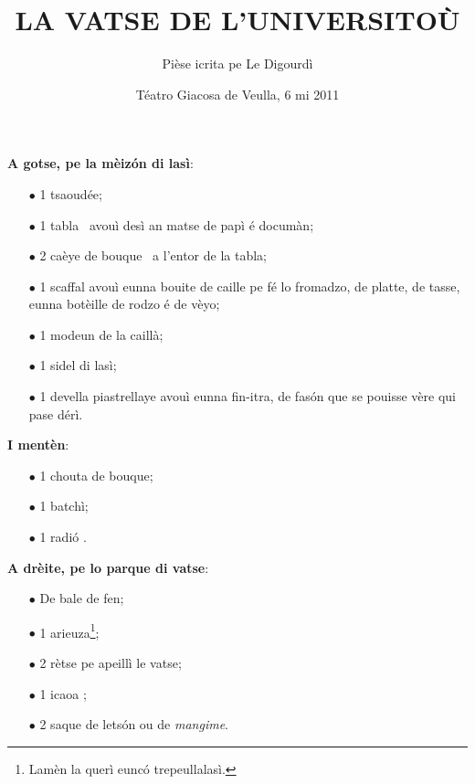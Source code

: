 \title{LA VATSE DE L’UNIVERSITO\`U}
\author{Pièse icrita pe Le Digourdì}
\date{Téatro Giacosa de Veulla, 6 mi 2011}

\maketitle






\Scenographie
\textbf{A gotse, pe la mèiz\'on di lasì}:
\begin{itemize}
\item[$\bullet$] 1 tsaoudée;
\item[$\bullet$] 1 tabla \tabla\ avouì desì an matse de papì é documàn;
\item[$\bullet$] 2 caèye de bouque \sediaLegno\ a l'entor de la tabla;
\item[$\bullet$] 1 scaffal avouì eunna bouite de caille pe fé lo fromadzo, de platte, de tasse, eunna botèille de rodzo é de vèyo;
\item[$\bullet$] 1 modeun de la caillà;
\item[$\bullet$] 1 sidel di lasì;
\item[$\bullet$] 1 devella piastrellaye avouì eunna fin-itra, de fas\'on que se pouisse vère qui pase dérì.
\end{itemize}
\vspace*{0.25cm}

\textbf{I mentèn}:

\begin{itemize}
\item[$\bullet$] 1 chouta de bouque;
\item[$\bullet$] 1 batchì;
\item[$\bullet$] 1 radi\'o \radio .
\end{itemize}
\vspace*{0.25cm}

\textbf{A drèite, pe lo parque di vatse}:

\begin{itemize}
\item[$\bullet$] De bale de fen;
\item[$\bullet$] 1 arieuza\footnote{ Lamèn la querì eunc\'o trepeullalasì.};
\item[$\bullet$] 2 rètse pe apeillì le vatse;
\item[$\bullet$] 1 icaoa \scopa ;
\item[$\bullet$] 2 saque de lets\'on ou de \textit{mangime}.
\end{itemize}

